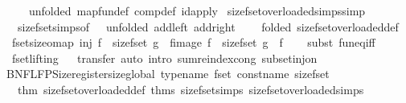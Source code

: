 \begin{isabellebody}
\ \ \ \ unfolded\ map{\isacharunderscore}fun{\isacharunderscore}def\ comp{\isacharunderscore}def\ id{\isacharunderscore}apply{\isacharbrackright}\isanewline
\isanewline
{}\isamarkupfalse%
\ size{\isacharunderscore}fset{\isacharunderscore}overloaded{\isacharunderscore}simps{\isacharbrackleft}simp{\isacharbrackright}\ {\isacharequal}\isanewline
\ \ size{\isacharunderscore}fset{\isacharunderscore}simps{\isacharbrackleft}of\ {\isachardoublequoteopen}{\isasymlambda}{\isacharunderscore}{\isachardot}\ {}{\isachardoublequoteclose}{\isacharcomma}\ unfolded\ add{\isacharunderscore}{}{\isacharunderscore}left\ add{\isacharunderscore}{}{\isacharunderscore}right{\isacharcomma}\isanewline
\ \ \ \ folded\ size{\isacharunderscore}fset{\isacharunderscore}overloaded{\isacharunderscore}def{\isacharbrackright}\isanewline
\isanewline
{}\isamarkupfalse%
\ fset{\isacharunderscore}size{\isacharunderscore}o{\isacharunderscore}map{\isacharcolon}\ {\isachardoublequoteopen}inj\ f\ {\isasymLongrightarrow}\ size{\isacharunderscore}fset\ g\ {\isasymcirc}\ fimage\ f\ {\isacharequal}\ size{\isacharunderscore}fset\ {\isacharparenleft}g\ {\isasymcirc}\ f{\isacharparenright}{\isachardoublequoteclose}\isanewline
%
\isadelimproof
\ \ %
\endisadelimproof
%
\isatagproof
{}\isamarkupfalse%
\ {\isacharparenleft}subst\ fun{\isacharunderscore}eq{\isacharunderscore}iff{\isacharparenright}%
\endisatagproof
{\isafoldproof}%
%
\isadelimproof
\isanewline
%
\endisadelimproof
\ \ \isamarkupfalse%
\ fset{\isachardot}lifting%
\isadelimproof
\ %
\endisadelimproof
%
\isatagproof
{}\isamarkupfalse%
\ transfer\ {\isacharparenleft}auto\ intro{\isacharcolon}\ sum{\isachardot}reindex{\isacharunderscore}cong\ subset{\isacharunderscore}inj{\isacharunderscore}on{\isacharparenright}%
\endisatagproof
{\isafoldproof}%
%
\isadelimproof
%
\endisadelimproof
\isanewline
%
\isadelimML
\isanewline
%
\endisadelimML
%
\isatagML
{}\isamarkupfalse%
\ {\isacartoucheopen}\isanewline
BNF{\isacharunderscore}LFP{\isacharunderscore}Size{\isachardot}register{\isacharunderscore}size{\isacharunderscore}global\ {\isacharat}{\isacharbraceleft}type{\isacharunderscore}name\ fset{\isacharbraceright}\ {\isacharat}{\isacharbraceleft}const{\isacharunderscore}name\ size{\isacharunderscore}fset{\isacharbraceright}\isanewline
\ \ {\isacharat}{\isacharbraceleft}thm\ size{\isacharunderscore}fset{\isacharunderscore}overloaded{\isacharunderscore}def{\isacharbraceright}\ {\isacharat}{\isacharbraceleft}thms\ size{\isacharunderscore}fset{\isacharunderscore}simps\ size{\isacharunderscore}fset{\isacharunderscore}overloaded{\isacharunderscore}simps{\isacharbraceright}\isanewline

\end{isabellebody}
